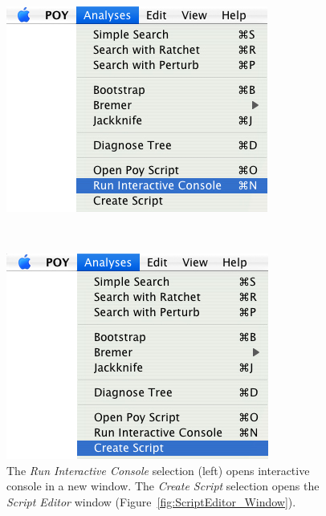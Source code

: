 {\begin{figure}
\centering
\begin{minipage}[c]{0.45\textwidth}
   		\includegraphics[width=\textwidth]{doc/figures/runinteractive_menu.jpg}
\end{minipage}
\,
\begin{minipage}[c]{0.52\textwidth}
	   	\includegraphics[width=\textwidth]{doc/figures/create_script_window.jpg}
   	\end{minipage}
\caption{The \emph{Run Interactive Console} selection (left) opens \poy interactive console in a new window. The \emph{Create Script} selection opens the \emph{Script Editor} window (Figure~\ref{fig:ScriptEditor_Window}).}
\label{fig:runinteractive}
\end{figure}

}
